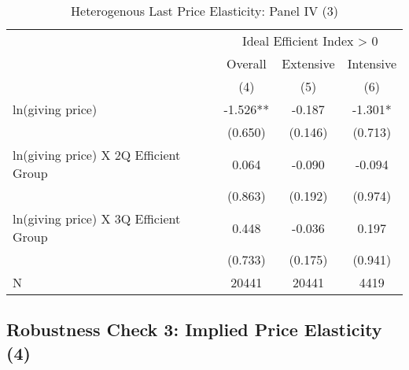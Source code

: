 \documentclass[ review  , 3p ]{elsarticle}
\begin{document}
  \begin{table}
  
  \caption{\label{tab:kableHeteroShortElasticitySlide3}Heterogenous Last Price Elasticity: Panel IV (3)}
  \centering
  \fontsize{8}{10}\selectfont
  \begin{tabular}[t]{lccc}
  \toprule
  \multicolumn{1}{c}{ } & \multicolumn{3}{c}{Ideal Efficient Index > 0} \\
  \cmidrule(l{3pt}r{3pt}){2-4}
  \multicolumn{1}{c}{ } & \multicolumn{1}{c}{Overall} & \multicolumn{1}{c}{Extensive} & \multicolumn{1}{c}{Intensive} \\
  \cmidrule(l{3pt}r{3pt}){2-2} \cmidrule(l{3pt}r{3pt}){3-3} \cmidrule(l{3pt}r{3pt}){4-4}
   & (4) & (5) & (6)\\
  \midrule
  ln(giving price) & -1.526** & -0.187 & -1.301*\\
   & (0.650) & (0.146) & (0.713)\\
  ln(giving price) X 2Q Efficient Group & 0.064 & -0.090 & -0.094\\
   & (0.863) & (0.192) & (0.974)\\
  ln(giving price) X 3Q Efficient Group & 0.448 & -0.036 & 0.197\\
   & (0.733) & (0.175) & (0.941)\\
  N & 20441 & 20441 & 4419\\
  \bottomrule
  \end{tabular}
  \end{table}
  
  \hypertarget{robustness-check-3-implied-price-elasticity-4}{%
  \subsection{Robustness Check 3: Implied Price Elasticity (4)}\label{robustness-check-3-implied-price-elasticity-4}}
  
\end{document}
